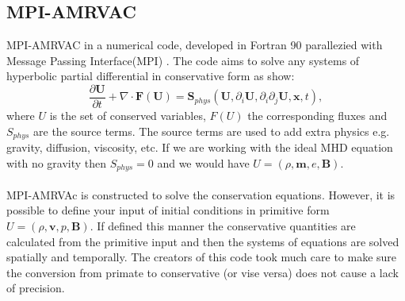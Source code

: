 \documentclass[12pt,a4paper,twoside]{article}
\begin{document}
\subsection{MPI-AMRVAC}
MPI-AMRVAC in a numerical code, developed in Fortran 90 parallezied with Message Passing Interface(MPI) \citep{Keppens2012}. The code aims to solve any systems of hyperbolic partial differential in conservative form as show: 
\begin{equation}\label{AMRVAC_stlye}
\frac{\partial \boldsymbol{U}}{\partial t} + \nabla \cdot \boldsymbol{F}(\boldsymbol{U}) = \boldsymbol{S}_{phys} (\boldsymbol{U}, \partial_{i} \boldsymbol{U}, \partial_i \partial_j \boldsymbol{U},\boldsymbol{x},t) ,
\end{equation}
where $U$ is the set of conserved variables, $F(U)$ the corresponding fluxes and $S_{phys}$ are the source terms. The source terms are used to add extra physics e.g. gravity, diffusion, viscosity, etc. If we are working with the ideal MHD equation with no gravity then $S_{phys} = $0 and we would have $U=(\rho, \boldsymbol{m}, e, \boldsymbol{B})$. \\ \\ MPI-AMRVAc is constructed to solve the conservation equations. However, it is possible to define your input of initial conditions in primitive form $U = (\rho, \boldsymbol{v}, p, \boldsymbol{B})$. If defined this manner the conservative quantities are calculated from the primitive input and then the systems of equations are solved spatially and temporally. The creators of this code took much care to make sure the conversion from primate to conservative (or vise versa) does not cause a lack of precision. \\ \\      
\end{document}
